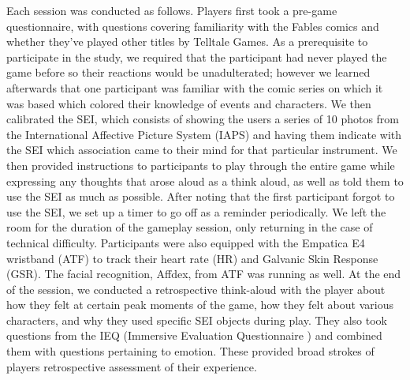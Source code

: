 Each session was conducted as follows. Players first took a pre-game
questionnaire, with questions covering familiarity with the Fables
comics and whether they've played other titles by Telltale Games. As a
prerequisite to participate in the study, we required that the
participant had never played the game before so their reactions would
be unadulterated; however we learned afterwards that one participant
was familiar with the comic series on which it was based which colored
their knowledge of events and characters. We then calibrated the SEI,
which consists of showing the users a series of 10 photos from the
International Affective Picture System (IAPS) \cite{Lang2005-xi} and
having them indicate with the SEI which association came to their mind
for that particular instrument. We then provided instructions to
participants to play through the entire game while expressing any
thoughts that arose aloud as a think aloud, as well as told them to
use the SEI as much as possible. After noting that the first
participant forgot to use the SEI, we set up a timer to go off as a
reminder periodically. We left the room for the duration of the
gameplay session, only returning in the case of technical
difficulty. Participants were also equipped with the Empatica E4
wristband (ATF) to track their heart rate (HR) and Galvanic Skin
Response (GSR). The facial recognition, Affdex, from ATF was running
as well.  At the end of the session, we conducted a retrospective
think-aloud with the player about how they felt at certain peak
moments of the game, how they felt about various characters, and why
they used specific SEI objects during play. They also took questions
from the IEQ (Immersive Evaluation Questionnaire
\cite{Jennett2008-qs}) and combined them with questions pertaining to
emotion. These provided broad strokes of players retrospective
assessment of their experience.


